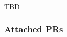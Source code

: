 \documentclass[../main.tex]{subfiles}
\begin{document}
TBD


\subsubsection*{Attached PRs}

\end{document}
